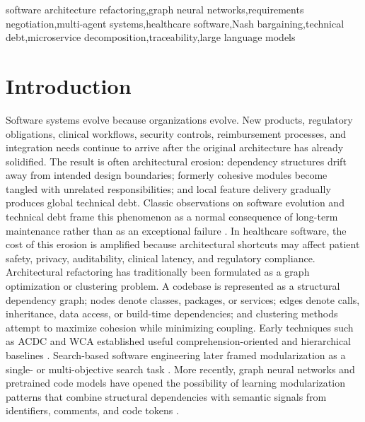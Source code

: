 \documentclass[english,preprint,nonatbib]{elsarticle}
\begin{document}
\begin{frontmatter}
\begin{keyword}
software architecture refactoring\sep graph neural networks\sep requirements negotiation\sep multi-agent systems\sep healthcare software\sep Nash bargaining\sep technical debt\sep microservice decomposition\sep traceability\sep large language models
\end{keyword}

\end{frontmatter}

\section{Introduction}
\label{sec:introduction}

Software systems evolve because organizations evolve. New products, regulatory obligations, clinical workflows, security controls, reimbursement processes, and integration needs continue to arrive after the original architecture has already solidified.
The result is often architectural erosion: dependency structures drift away from intended design boundaries;
formerly cohesive modules become tangled with unrelated responsibilities; and local feature delivery gradually produces global technical debt.
Classic observations on software evolution and technical debt frame this phenomenon as a normal consequence of long-term maintenance rather than as an exceptional failure \cite{lehman1980evolution,cunningham1992debt,seacord2003modernizing}.
In healthcare software, the cost of this erosion is amplified because architectural shortcuts may affect patient safety, privacy, auditability, clinical latency, and regulatory compliance.
Architectural refactoring has traditionally been formulated as a graph optimization or clustering problem.
A codebase is represented as a structural dependency graph; nodes denote classes, packages, or services;
edges denote calls, inheritance, data access, or build-time dependencies; and clustering methods attempt to maximize cohesion while minimizing coupling.
Early techniques such as ACDC and WCA established useful comprehension-oriented and hierarchical baselines \cite{tzerpos2000acdc,maqbool2004wca}.
Search-based software engineering later framed modularization as a single- or multi-objective search task \cite{harman2012sbse,mitchell2006bunch,praditwong2011moduleclustering}.
More recently, graph neural networks and pretrained code models have opened the possibility of learning modularization patterns that combine structural dependencies with semantic signals from identifiers, comments, and code tokens \cite{velickovic2018gat,feng2020codebert,guo2020graphcodebert,zhou2020gnnreview}.
\end{document}
